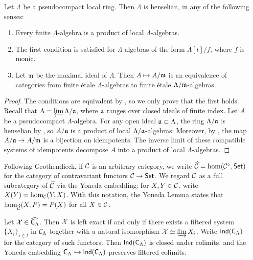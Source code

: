 \begin{lemma}
Let $\Lambda$ be a pseudocompact local ring. Then $\Lambda$ is henselian, in 
any of the following senses:
\begin{enumerate}
\item
Every finite $\Lambda$-algebra is a product of local $\Lambda$-algebras.

\item
The first condition is satisfied for $\Lambda$-algebras of the form 
$\Lambda[t]/f$, where $f$ is monic. 

\item
Let $\mathfrak{m}$ be the maximal ideal of $\Lambda$. Then $A\mapsto A/\mathfrak{m}$ is an 
equivalence of categories from finite \'etale $\Lambda$-algebras to 
finite \'etale $\Lambda/\mathfrak{m}$-algebras. 
\end{enumerate}
\end{lemma}
\begin{proof}
The conditions are equivalent by \cite[18.5.11]{ega4-4}, so we only prove 
that the first holds. Recall that 
$\Lambda = \varprojlim \Lambda/\mathfrak{a}$, where $\mathfrak{a}$ ranges over closed ideals of 
finite index. Let $A$ be a pseudocompact $\Lambda$-algebra. For any open 
ideal $\mathfrak{a}\subset \Lambda$, the ring $\Lambda/\mathfrak{a}$ is henselian by 
\cite[18.5.14]{ega4-4}, so $A/\mathfrak{a}$ is a product of local 
$\Lambda/\mathfrak{a}$-algebras. Moreover, by \cite[18.5.4]{ega4-4}, the map 
$A/\mathfrak{a} \to A/\mathfrak{m}$ is a bijection on idempotents. The inverse limit of 
these compatible systems of idempotents decompose $A$ into a product of local 
$\Lambda$-algebras. 
\end{proof}

Following Grothendieck, if $\mathcal{C}$ is an arbitrary category, we write 
$\widehat{\mathcal{C}}=\hom(\mathcal{C}^\circ,\mathsf{Set})$ for the category of contravariant functors 
$\mathcal{C}\to \mathsf{Set}$. We regard $\mathcal{C}$ as a full subcategory of $\widehat{\mathcal{C}}$ via the 
Yoneda embedding: for $X,Y\in \mathcal{C}$, write $X(Y) = \hom_{\mathcal{C}}(Y,X)$. With 
this notation, the Yoneda Lemma states that $\hom_{\widehat{\mathcal{C}}}(X,P) = P(X)$ 
for all $X\in \mathcal{C}$. 

\begin{lemma}\label{thm:ind-object-def}
Let $\mathcal{X}\in\widehat{\mathsf{C}_\Lambda}$. Then $\mathcal{X}$ is left exact if and only 
if there exists a filtered system $\{X_i\}_{i\in I}$ in $\mathcal{C}_\Lambda$ together 
with a natural isomorphism $\mathcal{X}\simeq \varinjlim X_i$. Write 
$\operatorname{\mathsf{Ind}}(\mathsf{C}_\Lambda)$ for the category of such functors. Then 
$\operatorname{\mathsf{Ind}}(\mathsf{C}_\Lambda)$ is closed under colimits, and the 
Yoneda embedding $\mathsf{C}_\Lambda\hookrightarrow\operatorname{\mathsf{Ind}}(\mathsf{C}_\Lambda)$ 
preserves filtered colimits.
\end{lemma}

